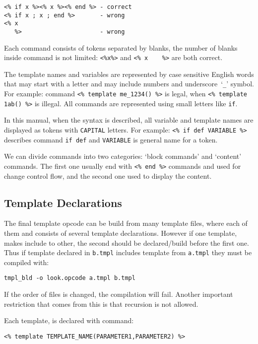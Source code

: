 \documentclass{article}
\newcommand{\tw}[1]{\texttt{#1}}
\begin{document}
\begin{verbatim}
<% if x %><% x %><% end %> - correct
<% if x ; x ; end %>       - wrong
<% x
   %>                      - wrong
\end{verbatim}

Each command consists of tokens separated by blanks, the number of blanks inside command is not limited: \verb+<%x%>+ 
and \verb+<% x    %>+ are both correct.

The template names and variables are represented by case sensitive
English words that may start with a letter and may include numbers and underscore~`\tw{\_}' symbol. 
For example: command \verb+<% template me_1234() %>+ is legal, when \verb+<% template 1ab() %>+ is illegal.
All commands are represented using small letters like \tw{if}.

In this manual, when the syntax is described, all variable and template names are displayed as tokens 
with \tw{CAPITAL} letters. For example: \verb+<% if def VARIABLE %>+ describes command \tw{if~def} and \tw{VARIABLE} 
is general name for a token. 

We can divide commands into two categories: `block commands' and `content' commands. The first one usually end with \verb+<% end %>+ commands and used for change control flow, and the second one used to display the content. 

\subsection{Template Declarations}

The final template opcode can be build from many template files, where each of them and consists of several template declarations. However if one template, makes include to other, the second should be declared/build before the first one. Thus if template declared in \tw{b.tmpl} includes template from \tw{a.tmpl} they must be compiled with:

\begin{verbatim}
tmpl_bld -o look.opcode a.tmpl b.tmpl
\end{verbatim}

If the order of files is changed, the compilation will fail. 
Another important restriction that comes from this is that recursion is not allowed.

Each template, is declared with command:

\begin{verbatim}
<% template TEMPLATE_NAME(PARAMETER1,PARAMETER2) %>
\end{verbatim}
\end{document}
